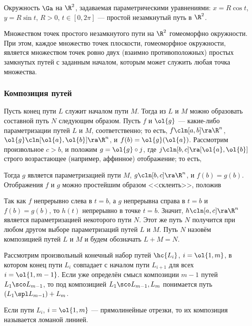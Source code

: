 \documentclass[a4paper]{article}
\begin{document}
\begin{ex}
Окружность $\Ga$ на $\R^2$, задаваемая параметрическими уравнениями:
$x=R\cos t$, $y=R\sin t$, $R>0$, $t\in[0,2\pi]$ --- простой
незамкнутый путь в $\R^2$.
\end{ex}

\begin{theorem}
\label{thm132} Множеством точек простого незамкнутого пути на $\R^2$
гомеоморфно окружности. При этом, каждое множество точек плоскости,
гомеоморфное окружности, является множеством точек ровно двух
(взаимно противоположных) простых замкнутых путей с заданным
началом, которым может служить любая точка множества.
\end{theorem}

\subsubsection{Композиция путей}
Пусть конец пути $L$ служит началом пути $M$. Тогда из $L$ и $M$
можно образовать составной путь $N$ следующим образом. Пусть $f$ и
$\ol{g}$ --- какие-либо параметризации путей $L$ и $M$,
соответственно; то есть, $f\cln[a,b]\ra\R^n$, $\ol{g}\cln
[\ol{a},\ol{b}]\ra\R^n$, и $f(b)=\ol{g}(\ol{a})$. Рассмотрим
произвольное $c>b$, и положим $g=\ol{g}\circ j$, где
$j\cln[b,c]\ra[\ol{a},\ol{b}]$ строго возрастающее (например,
аффинное) отображение; то есть,

Тогда $g$ является параметризацией пути $M$, $g\cln[b,c]\ra\R^n$, и
$f(b)=g(b)$. Отображения $f$ и $g$ можно простейшим образом
<<склеить>>, положив 

Так как $f$ непрерывно слева в $t=b$, а $g$ непрерывна справа в
$t=b$ и $f(b)=g(b)$, то $h(t)$ непрерывно в точке $t=b$. Значит,
$h\cln[a,c]\ra\R^n$ является параметризацией некоторого пути $N$.
Этот же путь $N$ получится при любом другом выборе параметризаций
путей $L$ и $M$. Путь $N$ назовём композицией путей $L$ и $M$ и
будем обозначать $L+M=N$.

Рассмотрим произвольный конечный набор путей $\hc{L_i}$,
$i=\ol{1,m}$, в котором конец пути $L_i$ совпадает с началом пути
$L_{i+1}$ для всех $i=\ol{1,m-1}$. Если уже определён смысл
композиции $m-1$ путей $L_1\sco L_{m-1}$, то под композицией
$L_1\sco L_{m-1},L_m$ понимается путь $(L_1\spl L_{m-1})+L_m$.

Если пути $L_i$, $i=\ol{1,m}$ --- прямолинейные отрезки, то их
композиция называется ломаной линией.
\end{document}
